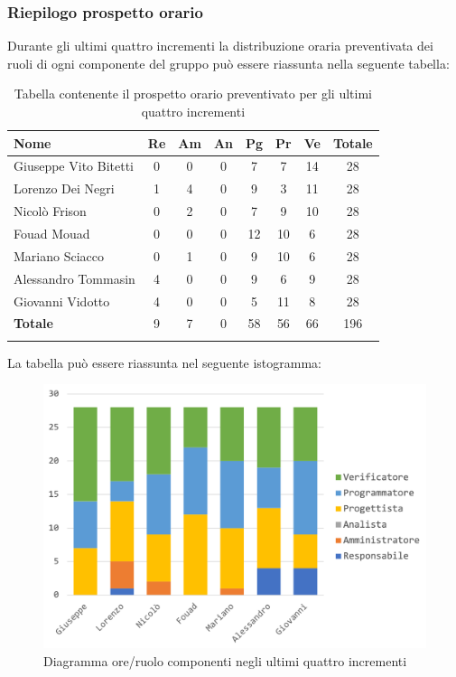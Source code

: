 	\subsubsection{Riepilogo prospetto orario}
	Durante gli ultimi quattro incrementi la distribuzione oraria preventivata dei ruoli di ogni componente del gruppo può essere riassunta nella seguente tabella:
	
	\begin{longtable}{|l|c|c|c|c|c|c|c|}
		\hline
		\rowcolor{lighter-grayer}
		\textbf{Nome} & \textbf{Re} & \textbf{Am} & \textbf{An} & \textbf{Pg}  & \textbf{Pr}   & \textbf{Ve} & \textbf{Totale} \\
		\hline
		\endfirsthead
		
		\hline
		Giuseppe Vito Bitetti 		 & 0 & 0 & 0 & 7 & 7 & 14 & 28\\
		\hline
		\hline
		Lorenzo Dei Negri			 & 1 & 4 & 0 & 9 & 3 & 11 & 28\\
		\hline
		\hline
		Nicolò Frison				    & 0 & 2 & 0 & 7 & 9 & 10 & 28\\
		\hline
		\hline
		Fouad Mouad 				 & 0 & 0 & 0 & 12 & 10 & 6 & 28\\
		\hline
		\hline
		Mariano Sciacco 			 & 0 & 1 & 0 & 9 & 10 & 6 & 28\\
		\hline
		\hline
		Alessandro Tommasin     & 4 & 0 & 0 & 9 & 6 & 9 & 28\\
		\hline
		\hline
		Giovanni Vidotto 			 & 4 & 0 & 0 & 5 & 11 & 8 & 28\\
		\hline 
		\textbf{Totale}			 		& 9 & 7 & 0 & 58 & 56 & 66 & 196\\
		\hline
		\caption{Tabella contenente il prospetto orario preventivato per gli ultimi quattro incrementi}
	\end{longtable}
	
	La tabella può essere riassunta nel seguente istogramma:
	\begin{figure}[H]
		\centering
		\includegraphics[width=0.8\linewidth]{./images/preventivo/incremento9-12-1.png}
		\caption{Diagramma ore/ruolo componenti negli ultimi quattro incrementi}
		\label{fig:diagramma suddivione ruoli incrementi IX-XII}
	\end{figure}
	\pagebreak
	
